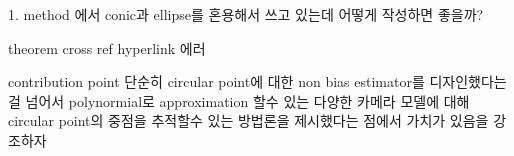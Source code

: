 1.  method 에서 conic과 ellipse를 혼용해서 쓰고 있는데 어떻게 작성하면 좋을까?


theorem cross ref hyperlink 에러



contribution point
단순히 circular point에 대한 non bias estimator를 디자인했다는걸 넘어서
polynormial로 approximation 할수 있는 다양한 카메라 모델에 대해
circular point의 중점을 추적할수 있는 방법론을 제시했다는 점에서 가치가 있음을 강조하자